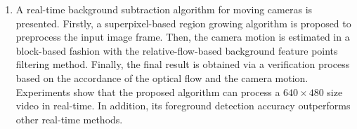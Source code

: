\begin{eabstract}
\begin{enumerate}
   \item A real-time background subtraction algorithm for moving cameras is presented. Firstly, a superpixel-based region growing algorithm is proposed to preprocess the input image frame. Then, the camera motion is estimated in a block-based fashion with the relative-flow-based background feature points filtering method. Finally, the final result is obtained via a verification process based on the accordance of the optical flow and the camera motion. Experiments show that the proposed algorithm can process a $640 \times 480$ size video in real-time. In addition, its foreground detection accuracy outperforms other real-time methods.
   \end{enumerate}

\end{eabstract}

